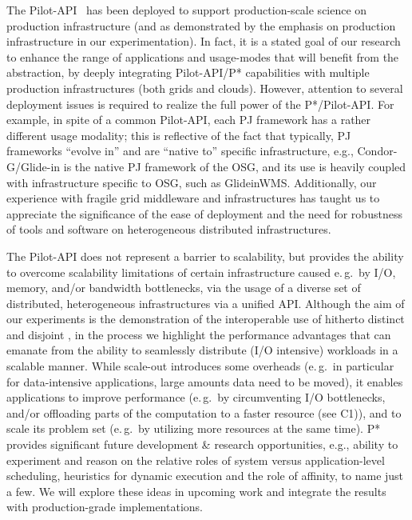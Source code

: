 \documentclass[conference]{IEEEtran}
\begin{document}
The Pilot-API~\cite{pilot_api} has been deployed to support production-scale 
science on production infrastructure (and as demonstrated by the emphasis on 
production infrastructure in our experimentation). In fact, it is a stated goal 
of our research to enhance the range of applications and usage-modes that will 
benefit from the \pilot abstraction, by deeply integrating Pilot-API/P* 
capabilities with multiple production infrastructures (both grids and clouds). 
However, attention to several deployment issues is required to realize the full 
power of the P*/Pilot-API. For example, in spite of a common Pilot-API, each PJ 
framework has a rather different usage modality; this is reflective of the fact 
that typically, PJ frameworks ``evolve in'' and are ``native to'' specific 
infrastructure, e.g., Condor-G/Glide-in is the native PJ framework of the OSG, 
and its use is heavily coupled with infrastructure specific to OSG, such as 
GlideinWMS. Additionally, our experience with fragile grid middleware and 
infrastructures has taught us to appreciate the significance of the ease of 
deployment and the need for robustness of tools and software on heterogeneous 
distributed infrastructures.


The Pilot-API does not represent a barrier to scalability, but
provides the ability to overcome scalability limitations of certain
infrastructure caused e.\,g.\ by I/O, memory, and/or bandwidth
bottlenecks, via the usage of a diverse set of distributed,
heterogeneous infrastructures via a unified API.  Although the aim of
our experiments is the demonstration of the interoperable use of
hitherto distinct and disjoint \pilotjobs, in the process we highlight
the performance advantages that can emanate from the ability to
seamlessly distribute (I/O intensive) workloads in a scalable manner.
While scale-out introduces some overheads (e.\,g.\ in particular for
data-intensive applications, large amounts data need to be moved), it
enables applications to improve performance (e.\,g.\ by circumventing
I/O bottlenecks, and/or offloading parts of the computation to a
faster resource (see C1)), and to scale its problem set (e.\,g.\ by
utilizing more resources at the same time).  P* provides significant
future development \& research opportunities, e.g., ability to
experiment and reason on the relative roles of system versus
application-level scheduling, heuristics for dynamic execution and the
role of affinity, to name just a few.  We will explore these ideas in
upcoming work and integrate the results with production-grade
implementations.
\end{document}
